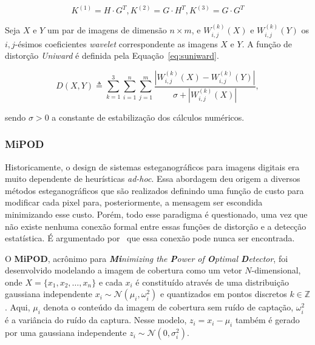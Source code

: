 \begin{equation}
	\label{eq:filters}
	K^{(1)} = H \cdot G^T, K^{(2)} = G \cdot H^T, K^{(3)} = G \cdot G^T
\end{equation}

Seja $X$ e $Y$ um par de imagens de dimensão $n \times m$, e $W^{(k)}_{i,j}(X)$ e $W^{(k)}_{i,j}(Y)$ os $i,j$-ésimos coeficientes \textit{wavelet} correspondente as imagens $X$ e $Y$. A função de distorção \textit{Uniward} é definida pela Equação~\ref{eq:suniward}.

\begin{equation}
\label{eq:suniward}
	D(X, Y) \triangleq \sum_{k=1}^{3}\sum_{i=1}^{n}\sum_{j=1}^{m} \frac{|W_{i,j}^{(k)}(X) - W_{i,j}^{(k)}(Y)|}{\sigma + |W_{i,j}^{(k)}(X)|},
\end{equation}

\noindent sendo $\sigma > 0$ a constante de estabilização dos cálculos numéricos.


\subsubsection{MiPOD}
\label{subsec:mipod}

Historicamente, o design de sistemas esteganográficos para imagens digitais era muito dependente de heurísticas \textit{ad-hoc}. Essa abordagem deu origem a diversos métodos esteganográficos \cite{hugo,holub2012designing,holub2014universal,li2014new} que são realizados definindo uma função de custo para modificar cada pixel para, posteriormente, a mensagem ser escondida minimizando esse custo. Porém, todo esse paradigma é questionado, uma vez que não existe nenhuma conexão formal entre essas funções de distorção e a detecção estatística. É argumentado por~ que essa conexão pode nunca ser encontrada.

O \textbf{MiPOD}, acrônimo para \textit{\textbf{Mi}nimizing the \textbf{P}ower of \textbf{O}ptimal \textbf{D}etector}, foi desenvolvido modelando a imagem de cobertura como um vetor $N$-dimensional, onde $X = \{x_1, x_2, \dots, x_n\}$ e cada $x_i$ é constituído através de uma distribuição gaussiana independente $x_i\sim\mathcal{N}(\mu_i, \omega_i^2)$ e quantizados em pontos discretos $k \in \mathbb{Z}$. Aqui, $\mu_i$ denota o conteúdo da imagem de cobertura sem ruído de captação, $\omega_i^2$ é a variância do ruído da captura. Nesse modelo, $z_i = x_i - \mu_i$ também é gerado por uma gaussiana independente $z_i \sim \mathcal{N}(0, \sigma_i^2)$.

